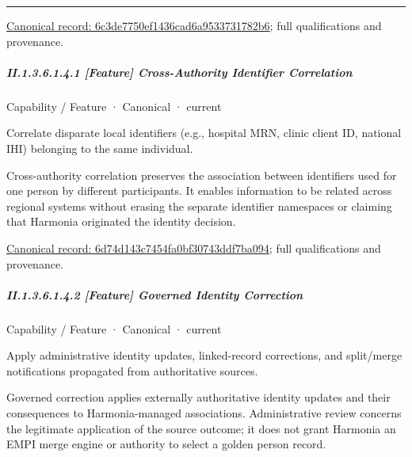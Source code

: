 \medskip\hrule\medskip

{\footnotesize \href{../../../../continuum/strategy/capability/6c3de7750ef1436cad6a9533731782b6.md}{Canonical record: 6c3de7750ef1436cad6a9533731782b6}; full qualifications and provenance.}\par
\subparagraph*{II.1.3.6.1.4.1 [Feature] Cross-Authority Identifier Correlation}
\label{navigation:II.1.3.6.1.4.1}

\label{element:6d74d143c7454fa0bf30743ddf7ba094}
{\small Capability / Feature · Canonical · current}\par

Correlate disparate local identifiers (e.g., hospital MRN, clinic client ID, national IHI) belonging to the same individual.



Cross-authority correlation preserves the association between identifiers used for one person by different participants. It enables information to be related across regional systems without erasing the separate identifier namespaces or claiming that Harmonia originated the identity decision.


{\footnotesize \href{../../../../continuum/strategy/capability/feature/6d74d143c7454fa0bf30743ddf7ba094.md}{Canonical record: 6d74d143c7454fa0bf30743ddf7ba094}; full qualifications and provenance.}\par
\subparagraph*{II.1.3.6.1.4.2 [Feature] Governed Identity Correction}
\label{navigation:II.1.3.6.1.4.2}

\label{element:f7ab7a24e8234129b2ab02e9abd4fba2}
{\small Capability / Feature · Canonical · current}\par

Apply administrative identity updates, linked-record corrections, and split/merge notifications propagated from authoritative sources.



Governed correction applies externally authoritative identity updates and their consequences to Harmonia-managed associations. Administrative review concerns the legitimate application of the source outcome; it does not grant Harmonia an EMPI merge engine or authority to select a golden person record.



